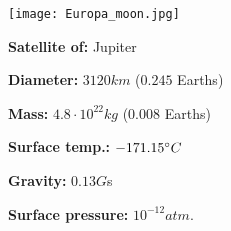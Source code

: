 \begin{tcolorbox}[colback=red!5,colframe=DarkRed!40!black,title=Europa \cite{Europa}]

{\centering
\texttt{[image: Europa\_moon.jpg]}
\par}

\textbf{Satellite of:} Jupiter

\textbf{Diameter:} $3120km$ ($0.245$ Earths)

\textbf{Mass:} $4.8\cdot 10^{22}kg$ ($0.008$ Earths)

\textbf{Surface temp.:} $-171.15\degree C$

\textbf{Gravity:} $0.13 G$s

\textbf{Surface pressure:} $10^{-12} atm.$
\end{tcolorbox}


